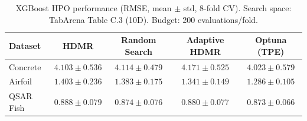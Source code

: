 \begin{table}[htbp]
\centering
\caption{XGBoost HPO performance (RMSE, mean $\pm$ std, 8-fold CV). Search space: TabArena Table C.3 (10D). Budget: 200 evaluations/fold.}
\label{tab:hpo_performance}
\begin{tabular}{lcccc}
\toprule
\textbf{Dataset} & \textbf{HDMR} & \textbf{Random Search} & \textbf{Adaptive HDMR} & \textbf{Optuna (TPE)} \\
\midrule
Concrete & $4.103 \pm 0.536$ & $4.114 \pm 0.479$ & $4.171 \pm 0.525$ & \textbf{$4.023 \pm 0.579$} \\
Airfoil & $1.403 \pm 0.236$ & $1.383 \pm 0.175$ & $1.341 \pm 0.149$ & \textbf{$1.286 \pm 0.105$} \\
QSAR Fish & $0.888 \pm 0.079$ & $0.874 \pm 0.076$ & $0.880 \pm 0.077$ & \textbf{$0.873 \pm 0.066$} \\
\bottomrule
\end{tabular}
\end{table}